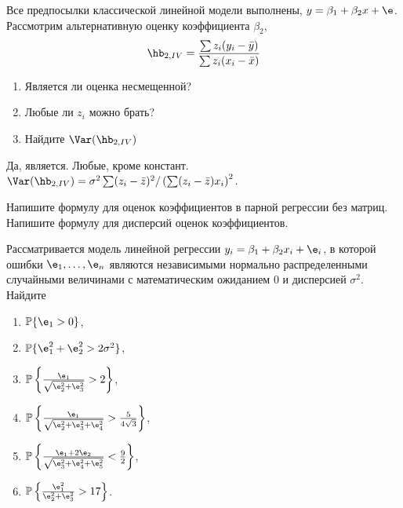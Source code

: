 \documentclass[pdftex,11pt,openany]{book}\usepackage[]{graphicx}\usepackage[]{color}
\begin{document}
\begin{problem}
Все предпосылки классической линейной модели выполнены, $y=\beta_1+\beta_2 x+\e$. Рассмотрим альтернативную оценку коэффициента $\beta_2$,
\begin{equation}
\hb_{2,IV}=\frac{\sum z_i(y_i-\bar{y})}{\sum z_i(x_i-\bar{x})}
\end{equation}
\begin{enumerate}
\item Является ли оценка несмещенной?
\item Любые ли $z_i$ можно брать?
\item Найдите $\Var(\hb_{2,IV})$
\end{enumerate}
\end{problem}

\begin{solution}
Да, является. Любые, кроме констант. $\Var(\hb_{2,IV})=\sigma^2 \sum (z_i-\bar{z})^2/ \left(\sum (z_i-\bar{z})x_i \right)^2 $.
\end{solution}

\begin{problem}
Напишите формулу для оценок коэффициентов в парной регрессии без матриц. Напишите формулу для дисперсий оценок коэффициентов.
\end{problem}

\begin{solution}
\end{solution}


\begin{problem}
Рассматривается модель линейной регрессии $y_i = \beta_1 + \beta_2x_i + \e_i$, в которой ошибки $\e_1, \ldots, \e_n$ являются независимыми нормально распределенными случайными величинами с математическим ожиданием $0$ и дисперсией $\sigma^2$. Найдите

\begin{enumerate}
  \item $\mathbb{P}\{\e_1 > 0\}$,
  \item $\mathbb{P}\{\e_1^2 + \e_2^2 > 2\sigma^2\}$,
  \item $\mathbb{P}\left\{\frac{\e_1}{\sqrt{\e_2^2 + \e_3^2}} > 2 \right\}$,
  \item $\mathbb{P}\left\{\frac{\e_1}{\sqrt{\e_2^2 + \e_3^2 + \e_4^2}} > \frac{5}{4\sqrt{3}} \right\}$,
  \item $\mathbb{P}\left\{\frac{\e_1 + 2\e_2}{\sqrt{\e_3^2 + \e_4^2 + \e_5^2}} < \frac{9}{2} \right\}$,
  \item $\mathbb{P}\left\{\frac{\e_1^2}{\e_2^2 + \e_3^2} > 17 \right\}$.
\end{enumerate}
\end{problem}
\end{document}

